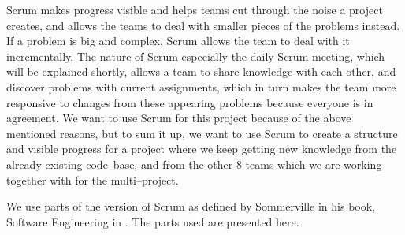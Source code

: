 Scrum makes progress visible and helps teams cut through the noise a project creates, and allows the teams to deal with smaller pieces of the problems instead.
If a problem is big and complex, Scrum allows the team to deal with it incrementally.
The nature of Scrum especially the daily Scrum meeting, which will be explained shortly, allows a team to share knowledge with each other, and discover problems with current assignments, which in turn makes the team more responsive to changes from these appearing problems because everyone is in agreement.
We want to use Scrum for this project because of the above mentioned reasons, but to sum it up, we want to use Scrum to create a structure and visible progress for a project where we keep getting new knowledge from the already existing code--base, and from the other 8 teams which we are working together with for the multi--project.

\newpage
We use parts of the version of Scrum as defined by Sommerville in his book, Software Engineering in \cite[Chapter~3]{SEBOOK}.
The parts used are presented here.

